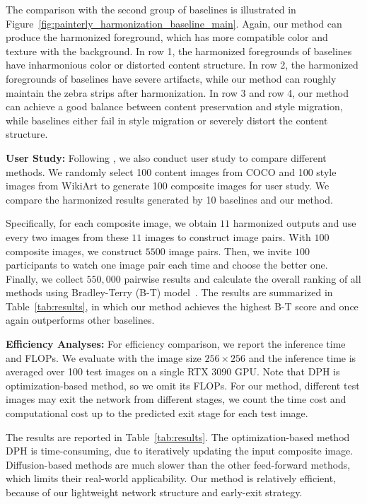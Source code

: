 \documentclass[letterpaper]{article} %
\begin{document}
The comparison with the second group of baselines is illustrated in Figure~\ref{fig:painterly_harmonization_baseline_main}. Again, our method can produce the harmonized foreground, which has more compatible color and texture with the background. In row 1, the harmonized foregrounds of baselines have inharmonious color or distorted content structure. In row 2, the harmonized foregrounds of baselines have severe artifacts, while our method can roughly maintain the zebra strips after harmonization. In row 3 and row 4, our method can achieve a good balance between content preservation and style migration, while baselines either fail in style migration or severely distort the content structure.


\textbf{User Study: }Following \cite{cao2022painterly}, we also conduct user study to compare different methods. We randomly select 100 content images from COCO and 100 style images from WikiArt to generate 100 composite images for user study. We compare the harmonized results generated by 10 baselines and our method.

Specifically, for each composite image, we obtain $11$ harmonized outputs and use every two images from these $11$ images to construct image pairs. With $100$ composite images, we construct $5500$ image pairs. Then, we invite $100$ participants to watch one image pair each time and choose the better one. Finally, we collect $550,000$ pairwise results and calculate the overall ranking of all methods using Bradley-Terry (B-T) model~\cite{bradley1952rank,lai2016comparative}.  The results are summarized in Table~\ref{tab:results}, in which our method achieves the highest B-T score and once again outperforms other baselines.


\textbf{Efficiency Analyses: } For efficiency comparison, we report the inference time and FLOPs. We evaluate with the image size $256 \times 256$ and the inference time is averaged over 100 test images on a single RTX 3090 GPU.
Note that DPH is optimization-based method, so we omit its FLOPs.
For our method, different test images may exit the network from different stages, we count the time cost and computational cost up to the predicted exit stage for each test image.

The results are reported in Table~\ref{tab:results}. The optimization-based method DPH is time-consuming, due to iteratively updating the input composite image. Diffusion-based methods are much slower than the other feed-forward methods, which limits their real-world applicability.
Our method is relatively efficient, because of our lightweight network structure and early-exit strategy.
\end{document}

